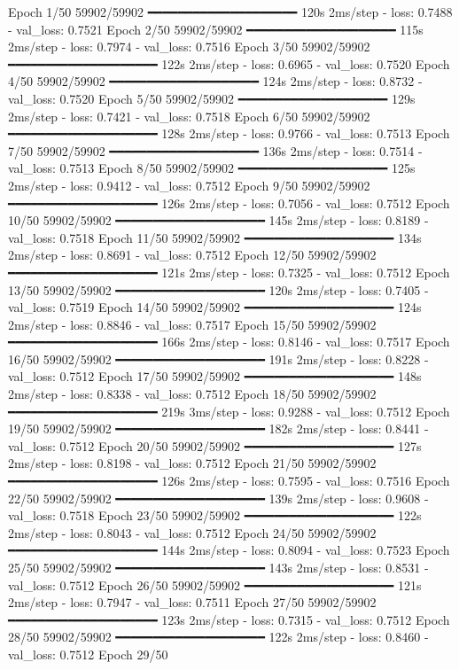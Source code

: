 Epoch 1/50
59902/59902 ━━━━━━━━━━━━━━━━━━━━ 120s 2ms/step - loss: 0.7488 - val_loss: 0.7521
Epoch 2/50
59902/59902 ━━━━━━━━━━━━━━━━━━━━ 115s 2ms/step - loss: 0.7974 - val_loss: 0.7516
Epoch 3/50
59902/59902 ━━━━━━━━━━━━━━━━━━━━ 122s 2ms/step - loss: 0.6965 - val_loss: 0.7520
Epoch 4/50
59902/59902 ━━━━━━━━━━━━━━━━━━━━ 124s 2ms/step - loss: 0.8732 - val_loss: 0.7520
Epoch 5/50
59902/59902 ━━━━━━━━━━━━━━━━━━━━ 129s 2ms/step - loss: 0.7421 - val_loss: 0.7518
Epoch 6/50
59902/59902 ━━━━━━━━━━━━━━━━━━━━ 128s 2ms/step - loss: 0.9766 - val_loss: 0.7513
Epoch 7/50
59902/59902 ━━━━━━━━━━━━━━━━━━━━ 136s 2ms/step - loss: 0.7514 - val_loss: 0.7513
Epoch 8/50
59902/59902 ━━━━━━━━━━━━━━━━━━━━ 125s 2ms/step - loss: 0.9412 - val_loss: 0.7512
Epoch 9/50
59902/59902 ━━━━━━━━━━━━━━━━━━━━ 126s 2ms/step - loss: 0.7056 - val_loss: 0.7512
Epoch 10/50
59902/59902 ━━━━━━━━━━━━━━━━━━━━ 145s 2ms/step - loss: 0.8189 - val_loss: 0.7518
Epoch 11/50
59902/59902 ━━━━━━━━━━━━━━━━━━━━ 134s 2ms/step - loss: 0.8691 - val_loss: 0.7512
Epoch 12/50
59902/59902 ━━━━━━━━━━━━━━━━━━━━ 121s 2ms/step - loss: 0.7325 - val_loss: 0.7512
Epoch 13/50
59902/59902 ━━━━━━━━━━━━━━━━━━━━ 120s 2ms/step - loss: 0.7405 - val_loss: 0.7519
Epoch 14/50
59902/59902 ━━━━━━━━━━━━━━━━━━━━ 124s 2ms/step - loss: 0.8846 - val_loss: 0.7517
Epoch 15/50
59902/59902 ━━━━━━━━━━━━━━━━━━━━ 166s 2ms/step - loss: 0.8146 - val_loss: 0.7517
Epoch 16/50
59902/59902 ━━━━━━━━━━━━━━━━━━━━ 191s 2ms/step - loss: 0.8228 - val_loss: 0.7512
Epoch 17/50
59902/59902 ━━━━━━━━━━━━━━━━━━━━ 148s 2ms/step - loss: 0.8338 - val_loss: 0.7512
Epoch 18/50
59902/59902 ━━━━━━━━━━━━━━━━━━━━ 219s 3ms/step - loss: 0.9288 - val_loss: 0.7512
Epoch 19/50
59902/59902 ━━━━━━━━━━━━━━━━━━━━ 182s 2ms/step - loss: 0.8441 - val_loss: 0.7512
Epoch 20/50
59902/59902 ━━━━━━━━━━━━━━━━━━━━ 127s 2ms/step - loss: 0.8198 - val_loss: 0.7512
Epoch 21/50
59902/59902 ━━━━━━━━━━━━━━━━━━━━ 126s 2ms/step - loss: 0.7595 - val_loss: 0.7516
Epoch 22/50
59902/59902 ━━━━━━━━━━━━━━━━━━━━ 139s 2ms/step - loss: 0.9608 - val_loss: 0.7518
Epoch 23/50
59902/59902 ━━━━━━━━━━━━━━━━━━━━ 122s 2ms/step - loss: 0.8043 - val_loss: 0.7512
Epoch 24/50
59902/59902 ━━━━━━━━━━━━━━━━━━━━ 144s 2ms/step - loss: 0.8094 - val_loss: 0.7523
Epoch 25/50
59902/59902 ━━━━━━━━━━━━━━━━━━━━ 143s 2ms/step - loss: 0.8531 - val_loss: 0.7512
Epoch 26/50
59902/59902 ━━━━━━━━━━━━━━━━━━━━ 121s 2ms/step - loss: 0.7947 - val_loss: 0.7511
Epoch 27/50
59902/59902 ━━━━━━━━━━━━━━━━━━━━ 123s 2ms/step - loss: 0.7315 - val_loss: 0.7512
Epoch 28/50
59902/59902 ━━━━━━━━━━━━━━━━━━━━ 122s 2ms/step - loss: 0.8460 - val_loss: 0.7512
Epoch 29/50
